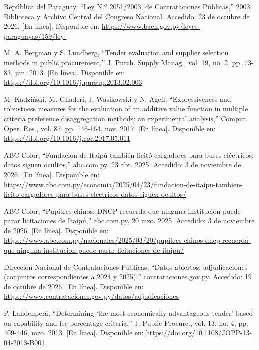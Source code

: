 \documentclass[12pt,a4paper]{article}
\newenvironment{reflist}{%
  \small\sloppy
  \begin{list}{}{%
    \setlength{\leftmargin}{1cm}%
    \setlength{\itemindent}{-1cm}%
    \setlength{\itemsep}{8pt}%
    \setlength{\parsep}{0pt}%
    \setlength{\listparindent}{0pt}%
  }%
}{\end{list}}
\begin{document}
\begin{reflist}
\item[] [32] República del Paraguay, ``Ley N.º 2051/2003, de Contrataciones Públicas,'' 2003. Biblioteca y Archivo Central del Congreso Nacional. Accedido: 23 de octubre de 2026. [En línea]. Disponible en: \url{https://www.bacn.gov.py/leyes-paraguayas/159/ley-}


\item[] [33] M. A. Bergman y S. Lundberg, ``Tender evaluation and supplier selection methods in public procurement,'' J. Purch. Supply Manag., vol. 19, no. 2, pp. 73-83, jun. 2013. [En línea]. Disponible en: \url{https://doi.org/10.1016/j.pursup.2013.02.003}

\item[] [34] M. Kadziński, M. Ghaderi, J. Wąsikowski y N. Agell, ``Expressiveness and robustness measures for the evaluation of an additive value function in multiple criteria preference disaggregation methods: an experimental analysis,'' Comput. Oper. Res., vol. 87, pp. 146-164, nov. 2017. [En línea]. Disponible en: \url{https://doi.org/10.1016/j.cor.2017.05.011}

\item[] [35] ABC Color, ``Fundación de Itaipú también licitó cargadores para buses eléctricos: datos siguen ocultos,'' abc.com.py, 23 abr. 2025. Accedido: 3 de noviembre de 2026. [En línea]. Disponible en: \url{https://www.abc.com.py/economia/2025/04/23/fundacion-de-itaipu-tambien-licito-cargadores-para-buses-electricos-datos-siguen-ocultos/}

\item[] [36] ABC Color, ``Pupitres chinos: DNCP recuerda que ninguna institución puede parar licitaciones de Itaipú,'' abc.com.py, 20 mzo. 2025. Accedido: 3 de noviembre de 2026. [En línea]. Disponible en: \url{https://www.abc.com.py/nacionales/2025/03/20/pupitres-chinos-dncp-recuerda-que-ninguna-institucion-puede-parar-licitaciones-de-itaipu/}

\item[] [37] Dirección Nacional de Contrataciones Públicas, ``Datos abiertos: adjudicaciones (conjuntos correspondientes a 2024 y 2025),'' contrataciones.gov.py. Accedido: 19 de octubre de 2026. [En línea]. Disponible en: \url{https://www.contrataciones.gov.py/datos/adjudicaciones}

\item[] [38] P. Lahdenperä, ``Determining `the most economically advantageous tender' based on capability and fee-percentage criteria,'' J. Public Procure., vol. 13, no. 4, pp. 409-446, mzo. 2013. [En línea]. Disponible en: \url{https://doi.org/10.1108/JOPP-13-04-2013-B001}


\end{reflist}
\end{document}
